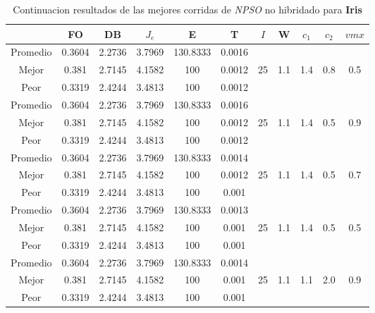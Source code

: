 \begin{table}[h!]
    \footnotesize
    \begin{center}
        \begin{tabular}{|c|c|c|c|c|c|c|c|c|c|c|}
        \hline
            & {\bf FO} & {\bf DB} & $J_e$ & {\bf E} & {\bf T} & $I$ & W & $c_1$ & $c_2$ & $vmx$ \\
        \hline
        \hline
            Promedio  & 0.3604 & 2.2736 & 3.7969 & 130.8333 & 0.0016 &  &  &  &  & \\
            \cline{1-6}
            Mejor & 0.381 & 2.7145  & 4.1582 & 100 & 0.0012 & 25 & 1.1 & 1.4 & 0.8 & 0.5\\
            \cline{1-6}
            Peor & 0.3319 & 2.4244  & 3.4813 & 100 & 0.0012 &  &  &  &  & \\
        \hline
        \hline
            Promedio  & 0.3604 & 2.2736 & 3.7969 & 130.8333 & 0.0016 &  &  &  &  & \\
            \cline{1-6}
            Mejor & 0.381 & 2.7145  & 4.1582 & 100 & 0.0012 & 25 & 1.1 & 1.4 & 0.5 & 0.9\\
            \cline{1-6}
            Peor & 0.3319 & 2.4244  & 3.4813 & 100 & 0.0012 &  &  &  &  & \\
        \hline
        \hline
            Promedio  & 0.3604 & 2.2736 & 3.7969 & 130.8333 & 0.0014 &  &  &  &  & \\
            \cline{1-6}
            Mejor & 0.381 & 2.7145  & 4.1582 & 100 & 0.0012 & 25 & 1.1 & 1.4 & 0.5 & 0.7\\
            \cline{1-6}
            Peor & 0.3319 & 2.4244  & 3.4813 & 100 & 0.001 &  &  &  &  & \\
        \hline
        \hline
            Promedio  & 0.3604 & 2.2736 & 3.7969 & 130.8333 & 0.0013 &  &  &  &  & \\
            \cline{1-6}
            Mejor & 0.381 & 2.7145  & 4.1582 & 100 & 0.001 & 25 & 1.1 & 1.4 & 0.5 & 0.5\\
            \cline{1-6}
            Peor & 0.3319 & 2.4244  & 3.4813 & 100 & 0.001 &  &  &  &  & \\
        \hline
        \hline
            Promedio  & 0.3604 & 2.2736 & 3.7969 & 130.8333 & 0.0014 &  &  &  &  & \\
            \cline{1-6}
            Mejor & 0.381 & 2.7145  & 4.1582 & 100 & 0.001 & 25 & 1.1 & 1.1 & 2.0 & 0.9\\
            \cline{1-6}
            Peor & 0.3319 & 2.4244  & 3.4813 & 100 & 0.001 &  &  &  &  & \\
        \hline
        \end{tabular}
        \caption{Continuacion resultados de las mejores corridas de \emph{NPSO} no hibridado para {\bf Iris}}
        \label{tb:tablepsoalgcsvc}
    \end{center}
\end{table}
